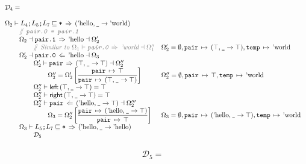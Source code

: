 \documentclass[12pt,twoside]{report}
\begin{document}
{\[\begin{array}{ll}
\end{array}\]
\[\begin{array}{ll}
  \mathcal{D}_4 = \\\\

  \Omega_2 \vdash L_4\mono{;}L_5\mono{;}L_7 \subtype \mono{*} \movearrowabs (\atom{hello}, \mono{\_} \rightarrow \atom{world}) \\
  \otab \ocomment{\mono{pair.0 = pair.1}} \\
  \otab \Omega_2 \dashv \mono{pair.1} \movearrowabs \atom{hello} \dashv \Omega_2' \\
  \otab\otab \ocomment{Similar to $\Omega_1 \vdash \mono{pair.0} \movearrowabs \atom{world} \dashv \Omega_1''$} &
    \Omega_2' = \emptyset, \absmapm{pair}{(\top, \mono{\_} \rightarrow \top)}, \absmapm{temp}{\atom{world}} \\
  \otab \Omega_2' \dashv \mono{pair.0} \writearrowabs \atom{hello} \dashv \Omega_3 \\
  \otab \otab \Omega_2' \vdash \mono{pair} \movearrowabs (\top, \mono{\_} \rightarrow \top) \dashv \Omega_2'' \\
  \otab\otab\otab \Omega_2'' = \Omega_2'\left[\dfrac{\absmapm{pair}{\top}}{\absmapm{pair}{(\top, \mono{\_} \rightarrow \top)}}\right] &
    \Omega_2'' = \emptyset, \absmapm{pair}{\top}, \absmapm{temp}{\atom{world}} \\
  \otab \otab \Omega_2'' \vdash \oleft{(\top, \mono{\_} \rightarrow \top)} = \top \\
  \otab \otab \Omega_2'' \vdash \oright{(\top, \mono{\_} \rightarrow \top)} = \top \\
  \otab \otab \Omega_2'' \vdash \mono{pair} \writearrowabs (\atom{hello}, \mono{\_} \rightarrow \top) \dashv \Omega_2''' \\
  \otab\otab\otab \Omega_3 = \Omega_2''\left[\dfrac{\absmapm{pair}{(\atom{hello}, \mono{\_} \rightarrow \top)}}{\absmapm{pair}{\top}}\right] &
    \Omega_3 = \emptyset,\absmapm{pair}{(\atom{hello}, \mono{\_} \rightarrow \top)}, \absmapm{temp}{\atom{world}} \\
  \otab \Omega_3 \vdash L_5\mono{;}L_7 \subtype \mono{*} \movearrowabs (\atom{hello}, \mono{\_} \rightarrow \atom{hello}) \\
  \otab\otab \mathcal{D}_5 \\
\end{array}\]

\[\begin{array}{ll}
  \mathcal{D}_5 = \\\\


\end{array}\]}
\end{document}
